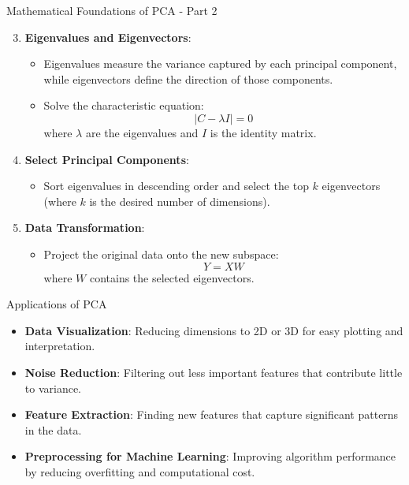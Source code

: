 \documentclass[aspectratio=169]{beamer}
\begin{document}
\begin{frame}[fragile]{Mathematical Foundations of PCA - Part 2}
    \begin{enumerate}
        \setcounter{enumi}{2} %
        \item \textbf{Eigenvalues and Eigenvectors}:
        \begin{itemize}
            \item Eigenvalues measure the variance captured by each principal component, while eigenvectors define the direction of those components.
            \item Solve the characteristic equation:
            \begin{equation}
                |C - \lambda I| = 0
            \end{equation}
            where \( \lambda \) are the eigenvalues and \( I \) is the identity matrix.
        \end{itemize}
        
        \item \textbf{Select Principal Components}:
        \begin{itemize}
            \item Sort eigenvalues in descending order and select the top \( k \) eigenvectors (where \( k \) is the desired number of dimensions).
        \end{itemize}
        
        \item \textbf{Data Transformation}:
        \begin{itemize}
            \item Project the original data onto the new subspace:
            \begin{equation}
                Y = X W
            \end{equation}
            where \( W \) contains the selected eigenvectors.
        \end{itemize}
    \end{enumerate}
\end{frame}

\begin{frame}[fragile]{Applications of PCA}
    \begin{itemize}
        \item \textbf{Data Visualization}: Reducing dimensions to 2D or 3D for easy plotting and interpretation.
        \item \textbf{Noise Reduction}: Filtering out less important features that contribute little to variance.
        \item \textbf{Feature Extraction}: Finding new features that capture significant patterns in the data.
        \item \textbf{Preprocessing for Machine Learning}: Improving algorithm performance by reducing overfitting and computational cost.
    \end{itemize}
\end{frame}
\end{document}
